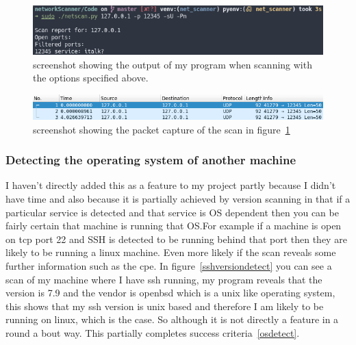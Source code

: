 \documentclass[titlepage]{article}
\let\Oldsubsubsection\subsubsection{}
\renewcommand{\subsubsection}{\FloatBarrier\Oldsubsubsection}
\begin{document}
\begin{figure}[H]
  \centering
  \includegraphics[width=\textwidth]{screenshots/udpfilteredoutput.png}
  \caption{%
    screenshot showing the output of my program when scanning with the
    options specified above.
  }\label{udpfilteredoutput}
\end{figure}

\begin{figure}[H]
  \centering
  \includegraphics[width=\textwidth]{screenshots/udpfilteredpcap.png}
  \caption{%
    screenshot showing the packet capture of the scan in figure~\ref{udpfilteredoutput}
  }\label{udpfilteredpcap}
\end{figure}

\subsubsection{Detecting the operating system of another machine}
I haven't directly added this as a feature to my project partly because
I didn't have time and also because it is partially achieved by version
scanning in that if a particular service is detected and that service
is OS dependent then you can be fairly certain that machine is running
that OS.\@ For example if a machine is open on \gls{tcp} port 22
and SSH is detected to be running behind that port then they are likely
to be running a linux machine. Even more likely if the scan reveals some
further information such as the \gls{cpe}. In figure~\ref{sshversiondetect}
you can see a scan of my machine where I have \gls{ssh} running,
my program reveals that the version is 7.9 and the vendor is openbsd
which is a unix like operating system, this shows that my ssh version
is unix based and therefore I am likely to be running on linux, which is
the case. So although it is not directly a feature in a round a bout way.
This partially completes success criteria~\ref{osdetect}.
\end{document}
